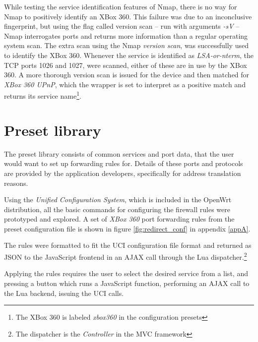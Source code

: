 \documentclass[a4paper,11pt,makeidx]{kth-bcs}
\begin{document}
While testing the service identification features of Nmap, there is no way for Nmap to positively identify an XBox 360.
This failure was due to an inconclusive fingerprint, but using the flag called version scan -- run with arguments \emph{-sV} -- Nmap interrogates ports and returns more information than a regular operating system scan.
The extra scan using the Nmap \emph{version scan}, was successfully used to identify the XBox 360.
Whenever the service is identified as \emph{LSA-or-nterm}, the TCP ports 1026 and 1027, were scanned, either of these are in use by the XBox 360.\cite{aretheysecure}
A more thorough version scan is issued for the device and then matched for \emph{XBox 360 UPnP}, which the wrapper is set to interpret as a positive match and returns its service name\footnote{The XBox 360 is labeled \emph{xbox360} in the configuration presets}.

\section{Preset library}
The preset library consists of common services and port data, that the user would want to set up forwarding rules for.
Details of these ports and protocols are provided by the application developers, specifically for address translation reasons.

Using the \emph{Unified Configuration System}, which is included in the OpenWrt distribution, all the basic commands for configuring the firewall rules were prototyped and explored.
A set of \emph{XBox 360} port forwarding rules from the preset configuration file is shown in figure \ref{fig:redirect_conf} in appendix \ref{appA}.

The rules were formatted to fit the UCI configuration file format and returned as JSON to the JavaScript frontend in an AJAX call through the Lua dispatcher.\footnote{The dispatcher is the \emph{Controller} in the MVC framework}

Applying the rules requires the user to select the desired service from a list, and pressing a button which runs a JavaScript function, performing an AJAX call to the Lua backend, issuing the UCI calls.
\end{document}
